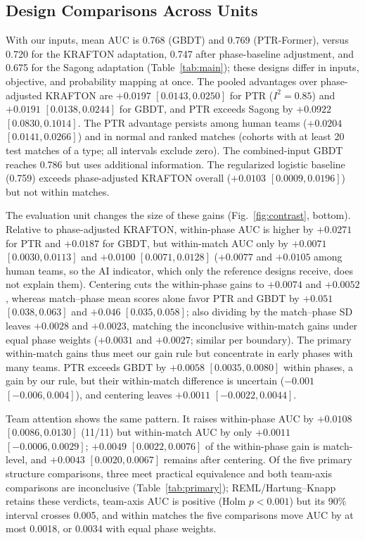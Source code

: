 \documentclass[sigconf,anonymous,nonacm]{acmart}
\begin{document}
\subsection{Design Comparisons Across Units}
\label{sec:results:rq2}

With our inputs, mean AUC is 0.768 (GBDT) and 0.769 (PTR-Former), versus 0.720 for the KRAFTON adaptation, 0.747 after phase-baseline adjustment, and 0.675 for the Sagong adaptation (Table~\ref{tab:main}); these designs differ in inputs, objective, and probability mapping at once. The pooled advantages over phase-adjusted KRAFTON are $+0.0197$ $[0.0143,\allowbreak 0.0250]$ for PTR ($I^2=0.85$) and $+0.0191$ $[0.0138,\allowbreak 0.0244]$ for GBDT, and PTR exceeds Sagong by $+0.0922$ $[0.0830,\allowbreak 0.1014]$. The PTR advantage persists among human teams ($+0.0204$ $[0.0141,\allowbreak 0.0266]$) and in normal and ranked matches (cohorts with at least 20 test matches of a type; all intervals exclude zero). The combined-input GBDT reaches 0.786 but uses additional information. The regularized logistic baseline (0.759) exceeds phase-adjusted KRAFTON overall ($+0.0103$ $[0.0009,\allowbreak 0.0196]$) but not within matches.

The evaluation unit changes the size of these gains (Fig.~\ref{fig:contrast}, bottom). Relative to phase-adjusted KRAFTON, within-phase AUC is higher by $+0.0271$ for PTR and $+0.0187$ for GBDT, but within-match AUC only by $+0.0071$ $[0.0030,\allowbreak 0.0113]$ and $+0.0100$ $[0.0071,\allowbreak 0.0128]$ ($+0.0077$ and $+0.0105$ among human teams, so the AI indicator, which only the reference designs receive, does not explain them). Centering cuts the within-phase gains to $+0.0074$ and $+0.0052$, whereas match--phase mean scores alone favor PTR and GBDT by $+0.051$ $[0.038,\allowbreak 0.063]$ and $+0.046$ $[0.035,\allowbreak 0.058]$; also dividing by the match--phase SD leaves $+0.0028$ and $+0.0023$, matching the inconclusive within-match gains under equal phase weights ($+0.0031$ and $+0.0027$; similar per boundary). The primary within-match gains thus meet our gain rule but concentrate in early phases with many teams. PTR exceeds GBDT by $+0.0058$ $[0.0035,\allowbreak 0.0080]$ within phases, a gain by our rule, but their within-match difference is uncertain ($-0.001$ $[-0.006,\allowbreak 0.004]$), and centering leaves $+0.0011$ $[-0.0022,\allowbreak 0.0044]$.


Team attention shows the same pattern. It raises within-phase AUC by $+0.0108$ $[0.0086,\allowbreak 0.0130]$ (11/11) but within-match AUC by only $+0.0011$ $[-0.0006,\allowbreak 0.0029]$; $+0.0049$ $[0.0022,\allowbreak 0.0076]$ of the within-phase gain is match-level, and $+0.0043$ $[0.0020,\allowbreak 0.0067]$ remains after centering. Of the five primary structure comparisons, three meet practical equivalence and both team-axis comparisons are inconclusive (Table~\ref{tab:primary}); REML/Hartung--Knapp retains these verdicts, team-axis AUC is positive (Holm $p<0.001$) but its 90\% interval crosses 0.005, and within matches the five comparisons move AUC by at most 0.0018, or 0.0034 with equal phase weights.
\end{document}
